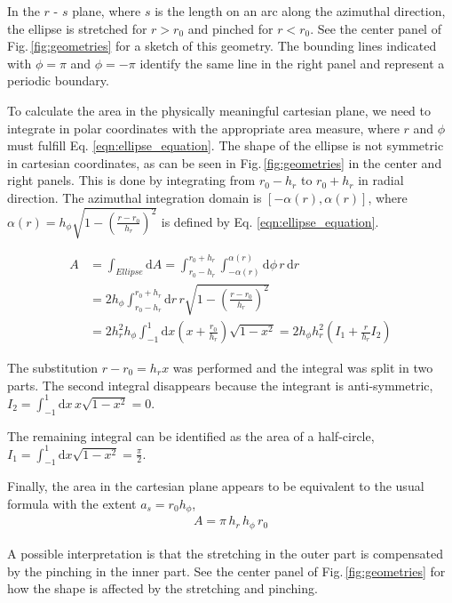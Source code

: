 \documentclass[a4paper]{scrartcl}
\begin{document}
In the $r$ - $s$ plane, where $s$ is the length on an arc along the azimuthal direction,
the ellipse is stretched for $r > r_0$ and pinched for $r < r_0$.
See the center panel of Fig.\,\ref{fig:geometries} for a sketch of this geometry.
The bounding lines indicated with $\phi=\pi$ and $\phi=-\pi$ identify the same line in the right panel
and represent a periodic boundary.

To calculate the area in the physically meaningful cartesian plane, 
we need to integrate in polar coordinates with the appropriate area measure,
where $r$ and $\phi$ must fulfill Eq. \eqref{eqn:ellipse_equation}.
The shape of the ellipse is not symmetric in cartesian coordinates, 
as can be seen in Fig.\,\ref{fig:geometries} in the center and right panels.
This is done by integrating from $r_0 - h_r$ to $r_0 + h_r$ in radial direction.
The azimuthal integration domain is $[-\alpha(r), \alpha(r)]$, where
$\alpha(r) = h_\phi \sqrt{1 - \left(\frac{r-r_0}{h_r}\right)^2}$ is defined by Eq. \eqref{eqn:ellipse_equation}.


\begin{align}
  A & = \int_{Ellipse} \mathrm{d}A
  = \int_{r_0 - h_r}^{r_0 + h_r} \int_{-\alpha(r)}^{\alpha(r)} \mathrm{d}\phi\,  r \, \mathrm{d}r                 \\
    & = 2 h_\phi \int_{r_0 - h_r}^{r_0 + h_r} \mathrm{d}r \, r \sqrt{1 - \left(\frac{r-r_0}{h_r}\right)^2} \\
    & = 2 h_r^2 h_\phi \int_{-1}^1 \mathrm{d}x \left(x + \frac{r_0}{h_r}\right) \sqrt{1-x^2}
  = 2 h_\phi h_r^2 \left( I_1 + \frac{r}{h_r} I_2 \right)
\end{align}

The substitution $r - r_0 = h_r x$ was performed and the integral was split in two parts.
The second integral disappears because the integrant is anti-symmetric, 
$  I_2 = \int_{-1}^{1} \mathrm{d} x\, x \sqrt{1 - x^2} = 0$.

The remaining integral can be identified as the area of a half-circle,
$I_1 = \int_{-1}^1 \mathrm{d} x \sqrt{1 - x^2} = \frac{\pi}{2}$.

Finally, the area in the cartesian plane appears to be equivalent to the usual formula with the extent $a_s = r_0 h_\phi$,
\begin{align}
  A = \pi \, h_r \, h_\phi \, r_0
\end{align}

A possible interpretation is that the stretching in the outer part is compensated by the pinching in the inner part.
See the center panel of Fig.\,\ref{fig:geometries} for how the shape is affected by the stretching and pinching.
\end{document}

